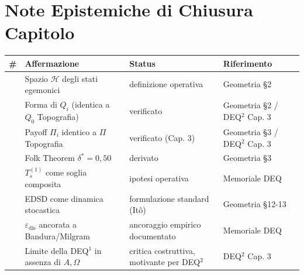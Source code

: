 \section{Note Epistemiche di Chiusura
Capitolo}\label{note-epistemiche-di-chiusura-capitolo}

{\def\LTcaptype{none} %
{\small\begin{longtable}[]{@{}
  >{\raggedright\arraybackslash}p{}
  >{\raggedright\arraybackslash}p{}
  >{\raggedright\arraybackslash}p{}
  >{\raggedright\arraybackslash}p{}@{}}
\toprule\noalign{}
\begin{minipage}[b]{\linewidth}\raggedright
\#
\end{minipage} & \begin{minipage}[b]{\linewidth}\raggedright
Affermazione
\end{minipage} & \begin{minipage}[b]{\linewidth}\raggedright
Status
\end{minipage} & \begin{minipage}[b]{\linewidth}\raggedright
Riferimento
\end{minipage} \\
\midrule\noalign{}
\endhead
\bottomrule\noalign{}
\endlastfoot
1 & Spazio \(\mathcal{H}\) degli stati egemonici & \Proved{} definizione
operativa & Geometria \S{}2 \\
2 & Forma di \(Q_i\) (identica a \(Q_0\) Topografia) & \Proved{}
verificato & Geometria \S{}2 / DEQ$^2$ Cap. 3 \\
3 & Payoff \(\Pi_i\) identico a $\Pi$ Topografia & \Proved{} verificato
(Cap. 3) & Geometria \S{}3 / DEQ$^2$ Cap. 3 \\
4 & Folk Theorem \(\delta^* = 0{,}50\) & \Proved{} derivato & Geometria
\S{}3 \\
5 & \(T_s^{(1)}\) come soglia composita & \Hypoth{} ipotesi operativa &
Memoriale DEQ \\
6 & EDSD come dinamica stocastica & \Proved{} formulazione standard
(Itô) & Geometria \S{}12-13 \\
7 & \(\varepsilon_{\text{dis}}\) ancorata a Bandura/Milgram & \Proved{}
ancoraggio empirico documentato & Memoriale DEQ \\
8 & Limite della DEQ$^1$ in assenza di \(A, \Omega\) & \Conj{} critica
costruttiva, motivante per DEQ$^2$ & DEQ$^2$ Cap. 3 \\
\end{longtable}}
}


